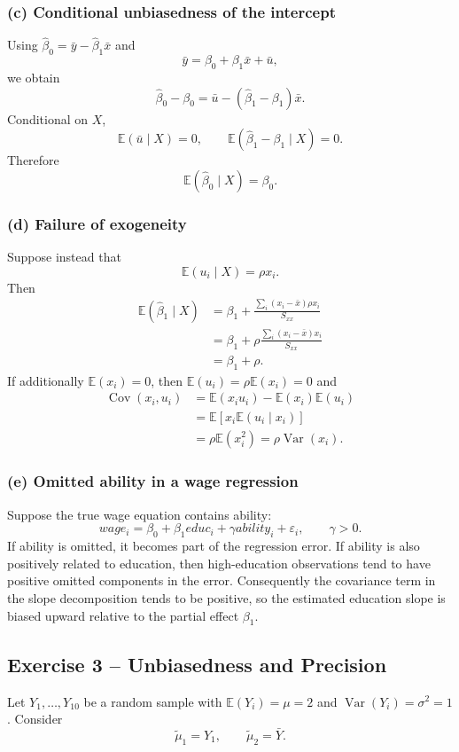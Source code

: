 \documentclass[11pt,a4paper]{article}
\newcommand{\E}{\mathbb{E}}
\newcommand{\Var}{\operatorname{Var}}
\newcommand{\Cov}{\operatorname{Cov}}
\newcommand{\Sxx}{S_{xx}}
\begin{document}
\subsubsection*{(c) Conditional unbiasedness of the intercept}
Using $\hat\beta_0=\bar y-\hat\beta_1\bar x$ and
\[
 \bar y=\beta_0+\beta_1\bar x+\bar u,
\]
we obtain
\[
 \hat\beta_0-\beta_0
 =\bar u-(\hat\beta_1-\beta_1)\bar x.
\]
Conditional on $X$,
\[
 \E(\bar u\mid X)=0,
 \qquad
 \E(\hat\beta_1-\beta_1\mid X)=0.
\]
Therefore
\[
 \boxed{\E(\hat\beta_0\mid X)=\beta_0}.
\]

\subsubsection*{(d) Failure of exogeneity}
Suppose instead that
\[
 \E(u_i\mid X)=\rho x_i.
\]
Then
\begin{align*}
 \E(\hat\beta_1\mid X)
 &=\beta_1+
 \frac{\sum_i(x_i-\bar x)\rho x_i}{\Sxx}\\
 &=\beta_1+\rho
 \frac{\sum_i(x_i-\bar x)x_i}{\Sxx}\\
 &=\boxed{\beta_1+\rho}.
\end{align*}
If additionally $\E(x_i)=0$, then $\E(u_i)=\rho\E(x_i)=0$ and
\begin{align*}
 \Cov(x_i,u_i)
 &=\E(x_iu_i)-\E(x_i)\E(u_i)\\
 &=\E\!\left[x_i\E(u_i\mid x_i)\right]\\
 &=\rho\E(x_i^2)
 =\boxed{\rho\Var(x_i)}.
\end{align*}

\subsubsection*{(e) Omitted ability in a wage regression}
Suppose the true wage equation contains ability:
\[
 wage_i=\beta_0+\beta_1 educ_i+\gamma ability_i+\varepsilon_i,
 \qquad \gamma>0.
\]
If ability is omitted, it becomes part of the regression error. If ability is also positively related to education, then high-education observations tend to have positive omitted components in the error. Consequently the covariance term in the slope decomposition tends to be positive, so the estimated education slope is biased upward relative to the partial effect $\beta_1$.

\subsection{Exercise 3 -- Unbiasedness and Precision}
Let $Y_1,\ldots,Y_{10}$ be a random sample with $\E(Y_i)=\mu=2$ and $\Var(Y_i)=\sigma^2=1$. Consider
\[
 \tilde\mu_1=Y_1,
 \qquad
 \tilde\mu_2=\bar Y.
\]
\end{document}
